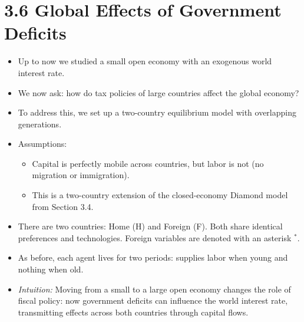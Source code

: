 \documentclass[12pt]{article}
\begin{document}
\section*{\noindent\textbf{3.6 Global Effects of Government Deficits}}

\begin{itemize}
  \item Up to now we studied a small open economy with an exogenous world interest rate. 

  \item We now ask: how do tax policies of large countries affect the global economy?

  \item To address this, we set up a two-country equilibrium model with overlapping generations.

  \item Assumptions:
  \begin{itemize}
    \item Capital is perfectly mobile across countries, but labor is not (no migration or immigration).
    \item This is a two-country extension of the closed-economy Diamond model from Section 3.4.
  \end{itemize}

  \item There are two countries: Home (H) and Foreign (F).  
  Both share identical preferences and technologies.  
  Foreign variables are denoted with an asterisk $^*$.

  \item As before, each agent lives for two periods: supplies labor when young and nothing when old.

  \item \textit{Intuition:} Moving from a small to a large open economy changes the role of fiscal policy: now government deficits can influence the world interest rate, transmitting effects across both countries through capital flows.
\end{itemize}
\end{document}
